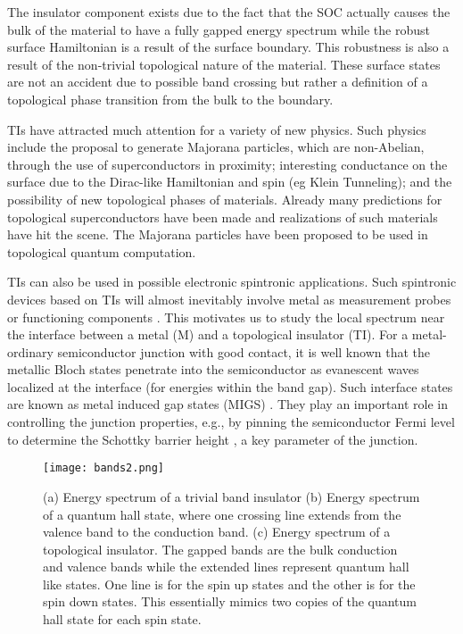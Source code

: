 \documentclass[11pt,revtex,aps]{report}
\begin{document}
The insulator component exists due to the fact that the SOC actually causes the bulk of the material to have a fully gapped energy spectrum while the robust surface Hamiltonian is a result of the surface boundary. This robustness is also a result of the non-trivial topological nature of the material. These surface states are not an accident due to possible band crossing but rather a definition of a topological phase transition from the bulk to the boundary.

TIs have attracted much attention for a variety of new physics. Such physics include the proposal to generate Majorana particles, which are non-Abelian, through the use of superconductors in proximity; interesting conductance on the surface due to the Dirac-like Hamiltonian and spin (eg Klein Tunneling); and the possibility of new topological phases of materials. Already many predictions for topological superconductors have been made and realizations of such materials have hit the scene. The Majorana particles have been proposed to be used in topological quantum computation. 


TIs can also be used in possible electronic spintronic applications. Such spintronic devices based on TIs will almost inevitably involve metal as measurement probes or functioning components \cite{yokoyama09}. This motivates us to study the local spectrum near the interface between a metal (M) and a topological insulator (TI). For a metal-ordinary semiconductor junction with good contact, it is well known that the metallic Bloch states penetrate into the semiconductor as evanescent waves localized at the interface (for energies within the band gap). Such interface states are known as metal induced gap states (MIGS) \cite{heine65,cohen}. They play an important role in controlling the junction properties, e.g., by pinning the semiconductor Fermi level to determine the Schottky barrier height \cite{tersoff}, a key parameter of the junction.

\begin{figure}
\center
\texttt{[image: bands2.png]}
\caption{(a) Energy spectrum of a trivial band insulator 
(b)  Energy spectrum of a quantum hall state, where one crossing line extends from the valence band to the conduction band. 
(c)  Energy spectrum of a topological insulator. The gapped bands are the bulk conduction and valence bands while the extended lines represent quantum hall like states. One line is for the spin up states and the other is for the spin down states. This essentially mimics two copies of the quantum hall state for each spin state.
}
\end{figure}
\end{document}
